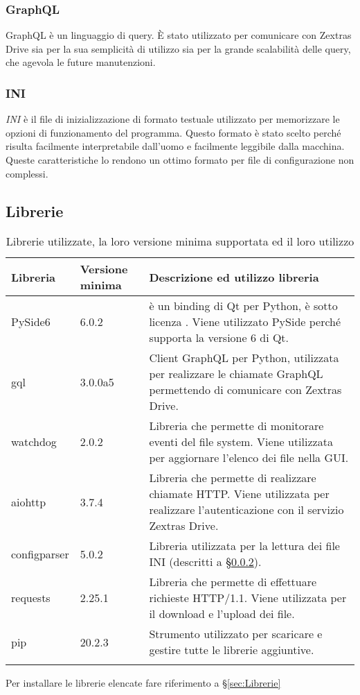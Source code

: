 {\subsubsection{GraphQL}
GraphQL è un linguaggio di query. È stato utilizzato per comunicare con Zextras Drive sia per la sua semplicità di utilizzo sia per la grande scalabilità delle query, che agevola le future manutenzioni.
\subsubsection{INI} \label{sec:ini}
\textit{INI} è il file di inizializzazione di formato testuale utilizzato per memorizzare le opzioni di funzionamento del programma. Questo formato è stato scelto perché risulta facilmente interpretabile dall'uomo e facilmente leggibile dalla macchina. Queste caratteristiche lo rendono un ottimo formato per file di configurazione non complessi.
\subsection{Librerie}
{
	\setlength{\freewidth}{\dimexpr\textwidth-1\tabcolsep}
	\renewcommand{\arraystretch}{1.5}
	\setlength{\aboverulesep}{0pt}
	\setlength{\belowrulesep}{0pt}
	\begin{longtable}{L{.15\freewidth} L{.15\freewidth} L{.70\freewidth}}
		\textbf{Libreria} & \textbf{Versione minima} & \textbf{Descrizione ed utilizzo libreria}\\
		\toprule
		\endhead
		PySide6 & 6.0.2 &  è un binding di Qt per Python, è sotto licenza . Viene utilizzato PySide perché supporta la versione 6 di Qt.\\
		gql & 3.0.0a5 & Client GraphQL per Python, utilizzata per realizzare le chiamate GraphQL permettendo di comunicare con Zextras Drive.\\
		watchdog & 2.0.2 & Libreria che permette di monitorare eventi del file system. Viene utilizzata per aggiornare l'elenco dei file nella GUI.\\
		aiohttp & 3.7.4 & Libreria che permette di realizzare chiamate HTTP. Viene utilizzata per realizzare l'autenticazione con il servizio Zextras Drive.\\
		configparser & 5.0.2 & Libreria utilizzata per la lettura dei file INI (descritti a \S{}\ref{sec:ini}).\\
		requests & 2.25.1 & Libreria che permette di effettuare richieste HTTP/1.1. Viene utilizzata per il download e l'upload dei file.\\
		pip & 20.2.3 & Strumento utilizzato per scaricare e gestire tutte le librerie aggiuntive.\\
		\bottomrule
		\hiderowcolors
		\caption{Librerie utilizzate, la loro versione minima supportata ed il loro utilizzo}
	\end{longtable}
}
Per installare le librerie elencate fare riferimento a \S{}\ref{sec:Librerie}
}
